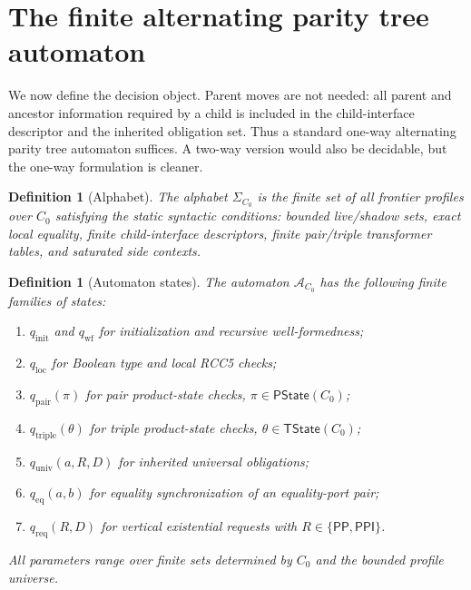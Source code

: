 \documentclass[11pt]{article}
\newtheorem{definition}[theorem]{Definition}
\newcommand{\PP}{\mathsf{PP}}
\newcommand{\PPI}{\mathsf{PPI}}
\newcommand{\Aut}{\mathcal A}
\begin{document}
\section{The finite alternating parity tree automaton}

We now define the decision object.  Parent moves are not needed: all parent and ancestor information required by a child is included in the child-interface descriptor and the inherited obligation set.  Thus a standard one-way alternating parity tree automaton suffices.  A two-way version would also be decidable, but the one-way formulation is cleaner.

\begin{definition}[Alphabet]
The alphabet $\Sigma_{C_0}$ is the finite set of all frontier profiles over $C_0$ satisfying the static syntactic conditions: bounded live/shadow sets, exact local equality, finite child-interface descriptors, finite pair/triple transformer tables, and saturated side contexts.
\end{definition}

\begin{definition}[Automaton states]
The automaton $\Aut_{C_0}$ has the following finite families of states:
\begin{enumerate}[label=(A\arabic*)]
\item $q_{\mathrm{init}}$ and $q_{\mathrm{wf}}$ for initialization and recursive well-formedness;
\item $q_{\mathrm{loc}}$ for Boolean type and local RCC5 checks;
\item $q_{\mathrm{pair}}(\pi)$ for pair product-state checks, $\pi\in\mathsf{PState}(C_0)$;
\item $q_{\mathrm{triple}}(\theta)$ for triple product-state checks, $\theta\in\mathsf{TState}(C_0)$;
\item $q_{\mathrm{univ}}(a,R,D)$ for inherited universal obligations;
\item $q_{\mathrm{eq}}(a,b)$ for equality synchronization of an equality-port pair;
\item $q_{\mathrm{req}}(R,D)$ for vertical existential requests with $R\in\{\PP,\PPI\}$.
\end{enumerate}
All parameters range over finite sets determined by $C_0$ and the bounded profile universe.
\end{definition}
\end{document}
